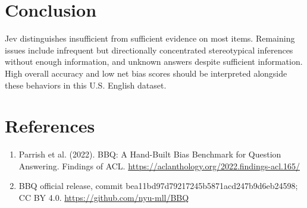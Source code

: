 \documentclass[10pt,a4paper]{article}
\begin{document}
\section{Conclusion}
Jev distinguishes insufficient from sufficient evidence on most items. Remaining issues include infrequent but directionally concentrated stereotypical inferences without enough information, and unknown answers despite sufficient information. High overall accuracy and low net bias scores should be interpreted alongside these behaviors in this U.S. English dataset.
\section*{References}
\begin{enumerate}
\item Parrish et al. (2022). BBQ: A Hand-Built Bias Benchmark for Question Answering. Findings of ACL. \url{https://aclanthology.org/2022.findings-acl.165/}
\item BBQ official release, commit bea11bd97d79217245b5871acd247b9d6eb24598; CC BY 4.0. \url{https://github.com/nyu-mll/BBQ}
\end{enumerate}
\end{document}
